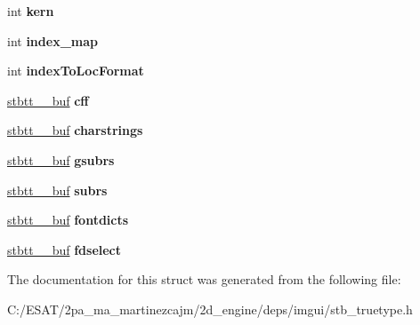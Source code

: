 \begin{DoxyCompactItemize}
int {\bfseries kern}
\item 
\mbox{\label{structstbtt__fontinfo_a0b95e3ac0c397b72b7696ce6696eb189}} 
int {\bfseries index\+\_\+map}
\item 
\mbox{\label{structstbtt__fontinfo_a5fa117a7ef058111a70a5b0b87d220f4}} 
int {\bfseries index\+To\+Loc\+Format}
\item 
\mbox{\label{structstbtt__fontinfo_a6031b4bda94aa2b5ff07ef5d626a15a4}} 
\hyperlink{structstbtt____buf}{stbtt\+\_\+\+\_\+buf} {\bfseries cff}
\item 
\mbox{\label{structstbtt__fontinfo_aaf04a69f8dd4b6a8bed4191b57145082}} 
\hyperlink{structstbtt____buf}{stbtt\+\_\+\+\_\+buf} {\bfseries charstrings}
\item 
\mbox{\label{structstbtt__fontinfo_afc5bfc4a52ad0e3879f0f81a372da7fb}} 
\hyperlink{structstbtt____buf}{stbtt\+\_\+\+\_\+buf} {\bfseries gsubrs}
\item 
\mbox{\label{structstbtt__fontinfo_aebc496bb1c001a8a90e0e66da16107d2}} 
\hyperlink{structstbtt____buf}{stbtt\+\_\+\+\_\+buf} {\bfseries subrs}
\item 
\mbox{\label{structstbtt__fontinfo_a966c70ac9548a02fff558846fbce3677}} 
\hyperlink{structstbtt____buf}{stbtt\+\_\+\+\_\+buf} {\bfseries fontdicts}
\item 
\mbox{\label{structstbtt__fontinfo_a4e06b1c29295a9aba529105e88fe1d71}} 
\hyperlink{structstbtt____buf}{stbtt\+\_\+\+\_\+buf} {\bfseries fdselect}
\end{DoxyCompactItemize}


The documentation for this struct was generated from the following file\+:\begin{DoxyCompactItemize}
\item 
C\+:/\+E\+S\+A\+T/2pa\+\_\+ma\+\_\+martinezcajm/2d\+\_\+engine/deps/imgui/stb\+\_\+truetype.\+h\end{DoxyCompactItemize}
